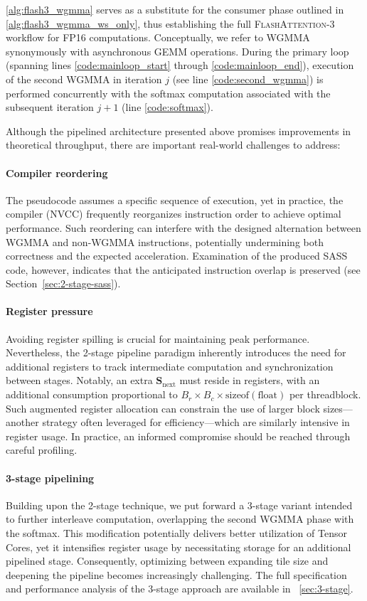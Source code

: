 \begin{algorithm}[H]
\begin{algorithmic}[1]
\cref{alg:flash3_wgmma} serves as a substitute for the consumer phase outlined in \cref{alg:flash3_wgmma_ws_only}, thus establishing the full \textsc{FlashAttention-3} workflow for FP16 computations. Conceptually, we refer to WGMMA synonymously with asynchronous GEMM operations. During the primary loop (spanning lines \ref{code:mainloop_start} through \ref{code:mainloop_end}), execution of the second WGMMA in iteration $j$ (see line \ref{code:second_wgmma}) is performed concurrently with the softmax computation associated with the subsequent iteration $j+1$ (line \ref{code:softmax}).

Although the pipelined architecture presented above promises improvements in theoretical throughput, there are important real-world challenges to address:
\paragraph{Compiler reordering} The pseudocode assumes a specific sequence of execution, yet in practice, the compiler (NVCC) frequently reorganizes instruction order to achieve optimal performance. Such reordering can interfere with the designed alternation between WGMMA and non-WGMMA instructions, potentially undermining both correctness and the expected acceleration. Examination of the produced SASS code, however, indicates that the anticipated instruction overlap is preserved (see Section~\ref{sec:2-stage-sass}).
\paragraph{Register pressure} Avoiding register spilling is crucial for maintaining peak performance. Nevertheless, the 2-stage pipeline paradigm inherently introduces the need for additional registers to track intermediate computation and synchronization between stages. Notably, an extra $\mathbf{S}_{\mathrm{next}}$ must reside in registers, with an additional consumption proportional to $B_r \times B_c \times \text{sizeof}(\text{float})$ per threadblock. Such augmented register allocation can constrain the use of larger block sizes—another strategy often leveraged for efficiency—which are similarly intensive in register usage. In practice, an informed compromise should be reached through careful profiling.
\paragraph{3-stage pipelining} Building upon the 2-stage technique, we put forward a 3-stage variant intended to further interleave computation, overlapping the second WGMMA phase with the softmax. This modification potentially delivers better utilization of Tensor Cores, yet it intensifies register usage by necessitating storage for an additional pipelined stage. Consequently, optimizing between expanding tile size and deepening the pipeline becomes increasingly challenging. The full specification and performance analysis of the 3-stage approach are available in ~\cref{sec:3-stage}.


\end{algorithmic}
\end{algorithm}
